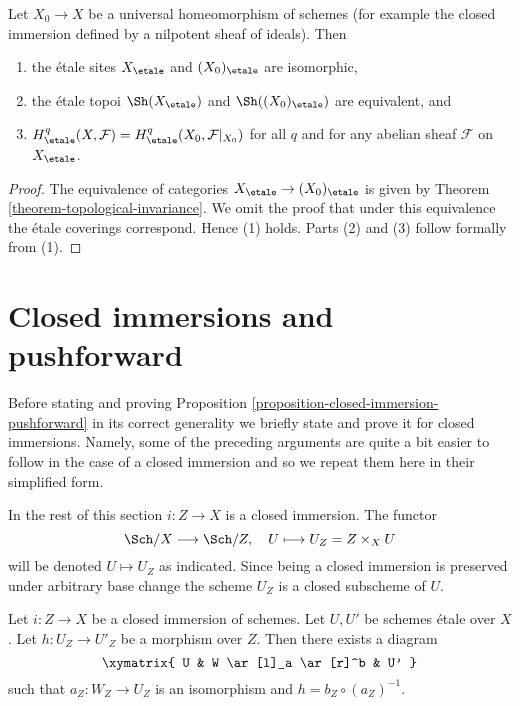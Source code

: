 \begin{proposition}
\label{proposition-topological-invariance}
Let $X_0 \to X$ be a universal homeomorphism of schemes
(for example the closed immersion defined by a nilpotent sheaf of ideals).
Then
\begin{enumerate}
\item the \'etale sites $X_\etale$ and $(X_0)_\etale$ are isomorphic,
\item the \'etale topoi $\Sh(X_\etale)$ and $\Sh((X_0)_\etale)$
are equivalent, and
\item $H^q_\etale(X, \mathcal{F}) = H^q_\etale(X_0, \mathcal{F}|_{X_0})$
for all $q$ and
for any abelian sheaf $\mathcal{F}$ on $X_\etale$.
\end{enumerate}
\end{proposition}

\begin{proof}
The equivalence of categories $X_\etale \to (X_0)_\etale$ is
given by Theorem \ref{theorem-topological-invariance}. We omit
the proof that under this equivalence the \'etale coverings correspond.
Hence (1) holds. Parts (2) and (3) follow formally from (1).
\end{proof}






\section{Closed immersions and pushforward}
\label{section-closed-immersions}

\noindent
Before stating and proving
Proposition \ref{proposition-closed-immersion-pushforward}
in its correct generality we briefly state and prove it for
closed immersions. Namely, some of the preceding arguments
are quite a bit easier to follow in the case of a closed immersion and
so we repeat them here in their simplified form.

\medskip\noindent
In the rest of this section $i : Z \to X$ is a closed immersion.
The functor
$$
\Sch/X \longrightarrow \Sch/Z, \quad
U \longmapsto U_Z = Z \times_X U
$$
will be denoted $U \mapsto U_Z$ as indicated. Since being a closed immersion
is preserved under arbitrary base change the scheme $U_Z$ is a closed subscheme
of $U$.

\begin{lemma}
\label{lemma-closed-immersion-almost-full}
Let $i : Z \to X$ be a closed immersion of schemes.
Let $U, U'$ be schemes \'etale over $X$. Let $h : U_Z \to U'_Z$
be a morphism over $Z$. Then there exists a diagram
$$
\xymatrix{
U & W \ar[l]_a \ar[r]^b & U'
}
$$
such that $a_Z : W_Z \to U_Z$ is an isomorphism and $h = b_Z \circ (a_Z)^{-1}$.
\end{lemma}

